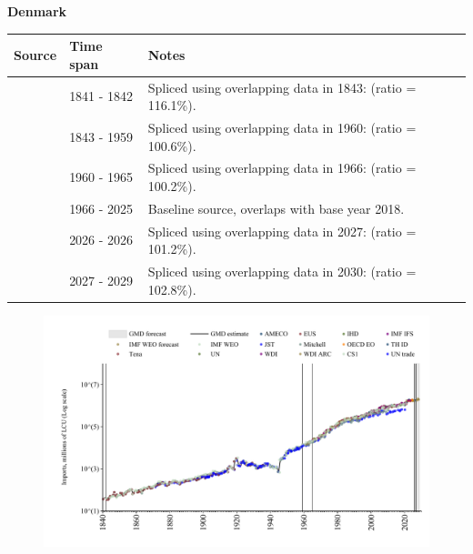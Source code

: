 \documentclass[12pt,a4paper,landscape]{article}
\begin{document}
\begin{adjustbox}{max totalsize={\paperwidth}{\paperheight},center}
\begin{minipage}[t][\textheight][t]{\textwidth}
\vspace*{0.5cm}
{}
\begin{center}
{\Large\bfseries Denmark}
\end{center}
\vspace{0.5cm}
\begin{table}[H]
\centering
\small
\begin{tabular}{|l|l|l|}
\hline
\textbf{Source} & \textbf{Time span} & \textbf{Notes} \\
\hline
\rowcolor{white}\cite{Tena}& 1841 - 1842 &Spliced using overlapping data in 1843: (ratio = 116.1\%).\\
\rowcolor{lightgray}\cite{CS1_DNK}& 1843 - 1959 &Spliced using overlapping data in 1960: (ratio = 100.6\%).\\
\rowcolor{white}\cite{AMECO}& 1960 - 1965 &Spliced using overlapping data in 1966: (ratio = 100.2\%).\\
\rowcolor{lightgray}\cite{OECD_EO}& 1966 - 2025 &Baseline source, overlaps with base year 2018.\\
\rowcolor{white}\cite{AMECO}& 2026 - 2026 &Spliced using overlapping data in 2027: (ratio = 101.2\%).\\
\rowcolor{lightgray}\cite{IMF_WEO_forecast}& 2027 - 2029 &Spliced using overlapping data in 2030: (ratio = 102.8\%).\\
\hline
\end{tabular}
\end{table}
\begin{figure}[H]
\centering
\includegraphics[width=\textwidth,height=0.6\textheight,keepaspectratio]{graphs/DNK_imports.pdf}
\end{figure}
\end{minipage}
\end{adjustbox}
\end{document}

